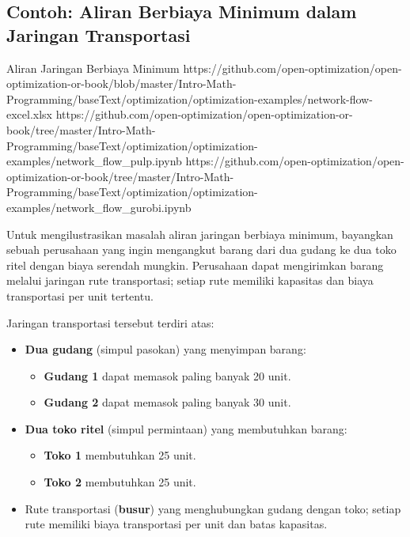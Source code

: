 \subsection{Contoh: Aliran Berbiaya Minimum dalam Jaringan Transportasi}

\begin{examplewithallcode}{Aliran Jaringan Berbiaya Minimum}
{https://github.com/open-optimization/open-optimization-or-book/blob/master/Intro-Math-Programming/baseText/optimization/optimization-examples/network-flow-excel.xlsx}
{https://github.com/open-optimization/open-optimization-or-book/tree/master/Intro-Math-Programming/baseText/optimization/optimization-examples/network_flow_pulp.ipynb}
{https://github.com/open-optimization/open-optimization-or-book/tree/master/Intro-Math-Programming/baseText/optimization/optimization-examples/network_flow_gurobi.ipynb}
\label{ex:min-cost-flow-warehouses}

Untuk mengilustrasikan masalah aliran jaringan berbiaya minimum, bayangkan sebuah perusahaan yang ingin mengangkut barang dari dua gudang ke dua toko ritel dengan biaya serendah mungkin. Perusahaan dapat mengirimkan barang melalui jaringan rute transportasi; setiap rute memiliki kapasitas dan biaya transportasi per unit tertentu.

Jaringan transportasi tersebut terdiri atas:
\begin{itemize}
    \item \textbf{Dua gudang} (simpul pasokan) yang menyimpan barang:
          \begin{itemize}
              \item \textbf{Gudang 1} dapat memasok paling banyak 20 unit.
              \item \textbf{Gudang 2} dapat memasok paling banyak 30 unit.
          \end{itemize}
    \item \textbf{Dua toko ritel} (simpul permintaan) yang membutuhkan barang:
          \begin{itemize}
              \item \textbf{Toko 1} membutuhkan 25 unit.
              \item \textbf{Toko 2} membutuhkan 25 unit.
          \end{itemize}
    \item Rute transportasi (\textbf{busur}) yang menghubungkan gudang dengan toko; setiap rute memiliki biaya transportasi per unit dan batas kapasitas.
\end{itemize}


\end{examplewithallcode}
